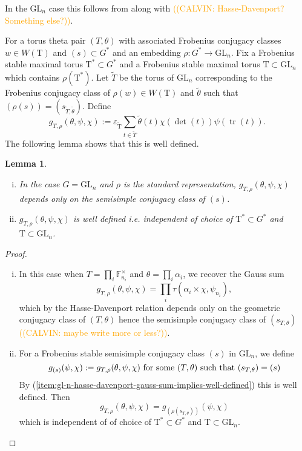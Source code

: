 \documentclass[12pt, reqno]{amsart}
\newtheorem{lemma}[theorem]{Lemma}
\theoremstyle{definition}
\theoremstyle{definition}
\theoremstyle{definition}
\newcommand{\multiplicativegroup}[1]{#1^{\times}}
\newcommand{\fieldCharacter}{\psi}
\newcommand{\trace}{\operatorname{tr}}
\newcommand{\GL}{\mathrm{GL}}
\newcommand{\finiteField}{\mathbb{F}}
\newcommand{\finiteFieldExtension}[1]{\finiteField_{#1}}
\newcommand{\algebraicGroup}[1]{\boldsymbol{\mathrm{#1}}}
\newcommand{\calvin}[1]{\textcolor{orange}{\sffamily ((CALVIN: #1))}}
\begin{document}
In the $\GL_n$ case this follows from  along with \calvin{Hasse-Davenport? Something else?}.


For a torus theta pair $(T,\theta)$ with associated Frobenius conjugacy classes $w \in W(\algebraicGroup{T})$ and $(s) \subset G^*$ and an embedding $\rho:G^* \to \GL_n$.  Fix a Frobenius stable maximal torus $\algebraicGroup{T}^* \subset G^*$ and a Frobenius stable maximal torus $\algebraicGroup{T} \subset \GL_n$ which contains $\rho(\algebraicGroup{T}^*)$. Let $\tilde{T}$ be the torus of $\GL_n$ corresponding to the Frobenius conjugacy class of $\rho(w) \in W(\algebraicGroup{T})$ and $\tilde{\theta}$ such that $(\rho(s)) = (s_{\tilde{T},\tilde{\theta}})$. Define
\[
    g_{T,\rho}(\theta,\psi,\chi) := \varepsilon_{\algebraicGroup{
    \tilde{T}}}\sum_{t\in \tilde{T}} \tilde{\theta}(t)\chi(\det(t))\psi(\trace(t)).
\]
The following lemma shows that this is well defined.

\begin{lemma}
\label{lemma:gl_invariance}
\begin{enumerate}[(i)]
	\item \label{item:gl-n-hasse-davenport-gauss-sum-implies-well-defined} In the case $G = \GL_n$ and $\rho$ is the standard representation, $g_{T,\rho}(\theta,\psi,\chi)$ depends only on the semisimple conjugacy class of $(s)$.
	\item $g_{T,\rho}(\theta,\psi,\chi)$ is well defined i.e. independent of choice of $\algebraicGroup{T}^* \subset G^*$ and $\algebraicGroup{T} \subset \GL_n$.
\end{enumerate}
\end{lemma}
\begin{proof}
\begin{enumerate}[(i)]
	\item In this case when $T = \prod_{i} \multiplicativegroup{\finiteFieldExtension{n_i}}$ and $\theta = \prod_{i} \alpha_i$, we recover the Gauss sum
	\[
	g_{T,\rho}(\theta,\psi,\chi)  = \prod_i \tau(\alpha_i \times \chi, \fieldCharacter_{n_i}),
	\]
	which by the Hasse-Davenport relation depends only on the geometric conjugacy class of $(T,\theta)$ hence the semisimple conjugacy class of $(s_{T,\theta})$ \calvin{maybe write more or less?}. 
	\item For a Frobenius stable semisimple conjugacy class $(s)$ in $\GL_n$, we define
	\[
	g_{(s)}(\psi,\chi) := g_{T,\rho}(\theta,\psi,\chi) \textnormal{ for some } (T,\theta) \textnormal{ such that } (s_{T,\theta}) = (s)
	\]
	By (\ref{item:gl-n-hasse-davenport-gauss-sum-implies-well-defined}) this is well defined. Then
	\[
	g_{T,\rho}(\theta,\psi,\chi)  = g_{(\rho(s_{T,\theta}))}(\psi,\chi)
	\]
	which is independent of of choice of $\algebraicGroup{T}^* \subset G^*$ and $\algebraicGroup{T} \subset \GL_n$.
\end{enumerate}
\end{proof}
\end{document}
